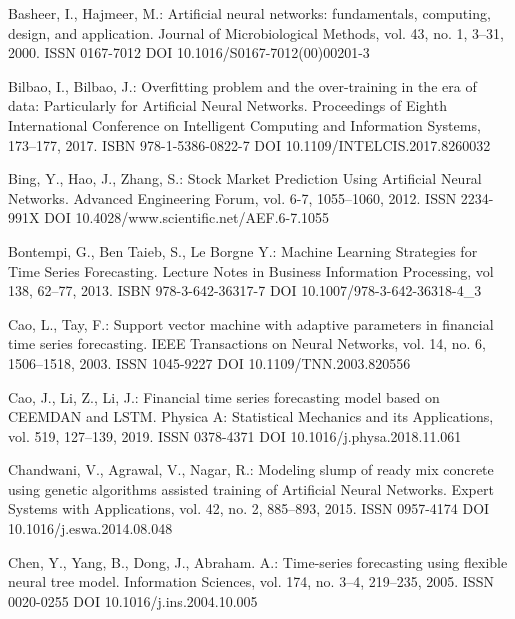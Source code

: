 
\begin{thebibliography}{99.}

 Basheer, I., Hajmeer, M.: Artificial neural networks: fundamentals, computing, design, and application. Journal of Microbiological Methods, vol. 43, no. 1, 3--31, 2000. ISSN 0167-7012 DOI 10.1016/S0167-7012(00)00201-3

 Bilbao, I., Bilbao, J.: Overfitting problem and the over-training in the era of data: Particularly for Artificial Neural Networks. Proceedings of Eighth International Conference on Intelligent Computing and Information Systems, 173--177, 2017. ISBN 978-1-5386-0822-7 DOI 10.1109/INTELCIS.2017.8260032

 Bing, Y., Hao, J., Zhang, S.: Stock Market Prediction Using Artificial Neural Networks. Advanced Engineering Forum, vol. 6-7, 1055--1060, 2012. ISSN 2234-991X DOI 10.4028/www.scientific.net/AEF.6-7.1055

 Bontempi, G., Ben Taieb, S., Le Borgne Y.: Machine Learning Strategies for Time Series Forecasting. Lecture Notes in Business Information Processing, vol 138, 62--77, 2013. ISBN 978-3-642-36317-7 DOI 10.1007/978-3-642-36318-4\_3

 Cao, L., Tay, F.: Support vector machine with adaptive parameters in financial time series forecasting. IEEE Transactions on Neural Networks, vol. 14, no. 6, 1506--1518, 2003. ISSN 1045-9227 DOI 10.1109/TNN.2003.820556

 Cao, J., Li, Z., Li, J.: Financial time series forecasting model based on CEEMDAN and LSTM. Physica A: Statistical Mechanics and its Applications, vol. 519, 127--139, 2019. ISSN 0378-4371 DOI 10.1016/j.physa.2018.11.061

 Chandwani, V., Agrawal, V., Nagar, R.: Modeling slump of ready mix concrete using genetic algorithms assisted training of Artificial Neural Networks. Expert Systems with Applications, vol. 42, no. 2, 885--893, 2015. ISSN 0957-4174 DOI 10.1016/j.eswa.2014.08.048

 Chen, Y., Yang, B., Dong, J., Abraham. A.: Time-series forecasting using flexible neural tree model. Information Sciences, vol. 174, no. 3--4, 219--235, 2005. ISSN 0020-0255 DOI 10.1016/j.ins.2004.10.005


\end{thebibliography}
